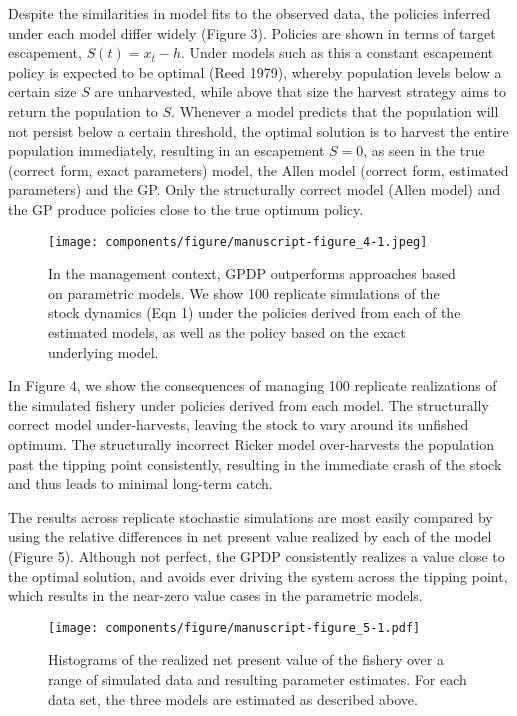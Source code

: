 \documentclass[author-year, 12pt,review]{components/elsarticle} %
\makeatletter
\def\maxwidth{\ifdim\Gin@nat@width>\linewidth\linewidth
\else\Gin@nat@width\fi}
\let\Oldincludegraphics\includegraphics
\renewcommand{\includegraphics}[1]{\Oldincludegraphics[width=\maxwidth]{#1}}
\makeatother
\begin{document}
Despite the similarities in model fits to the observed data, the
policies inferred under each model differ widely (Figure 3). Policies
are shown in terms of target escapement, $S(t) = x_t - h$. Under models
such as this a constant escapement policy is expected to be optimal
(Reed 1979), whereby population levels below a certain size $S$ are
unharvested, while above that size the harvest strategy aims to return
the population to $S$. Whenever a model predicts that the population
will not persist below a certain threshold, the optimal solution is to
harvest the entire population immediately, resulting in an escapement
$S=0$, as seen in the true (correct form, exact parameters) model, the
Allen model (correct form, estimated parameters) and the GP. Only the
structurally correct model (Allen model) and the GP produce policies
close to the true optimum policy.

\begin{figure}[htbp]
\centering
\texttt{[image: components/figure/manuscript-figure\_4-1.jpeg]}
\caption{In the management context, GPDP outperforms approaches based on
parametric models. We show 100 replicate simulations of the stock
dynamics (Eqn 1) under the policies derived from each of the estimated
models, as well as the policy based on the exact underlying model.}
\end{figure}

In Figure 4, we show the consequences of managing 100 replicate
realizations of the simulated fishery under policies derived from each
model. The structurally correct model under-harvests, leaving the stock
to vary around its unfished optimum. The structurally incorrect Ricker
model over-harvests the population past the tipping point consistently,
resulting in the immediate crash of the stock and thus leads to minimal
long-term catch.

The results across replicate stochastic simulations are most easily
compared by using the relative differences in net present value realized
by each of the model (Figure 5). Although not perfect, the GPDP
consistently realizes a value close to the optimal solution, and avoids
ever driving the system across the tipping point, which results in the
near-zero value cases in the parametric models.

\begin{figure}[htbp]
\centering
\texttt{[image: components/figure/manuscript-figure\_5-1.pdf]}
\caption{Histograms of the realized net present value of the fishery
over a range of simulated data and resulting parameter estimates. For
each data set, the three models are estimated as described above.}
\end{figure}
\end{document}
